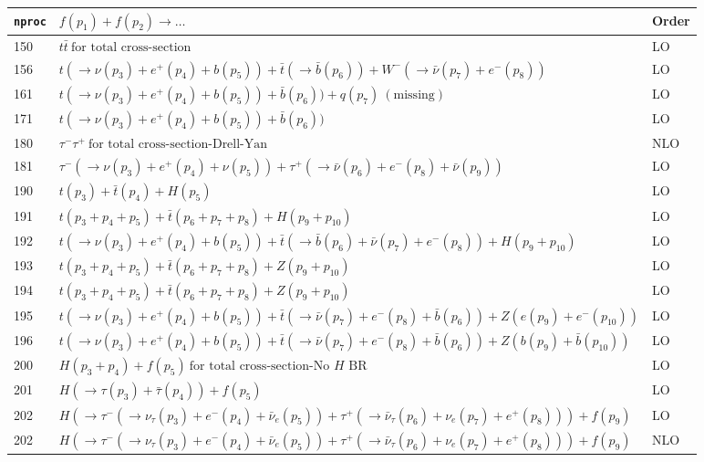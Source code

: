 \documentclass[12pt]{article}
\begin{document}
\begin{itemize}
\begin{table}
\begin{center}
\hspace*{-1.5cm}
\begin{tabular}{|l|l|l|}
\hline
{\tt nproc} & $f(p_1)+f(p_2) \to \ldots $& Order \\
\hline
150 & $ t \bar{t} ~\mbox{for total cross-section} $& LO \\ 
156 & $ t(\to\nu(p_3)+e^+(p_4)+b(p_5))+{\bar t}(\to
\bar{b}(p_6))+W^-(\to {\bar \nu}(p_7)+e^-(p_8))$& LO \\ 
\hline
161 & $ t(\to\nu(p_3)+e^+(p_4)+b(p_5))+\bar{b}(p_6))+q(p_7)~(\mathrm{missing}) $& LO \\ 
\hline
171 & $ t(\to \nu(p_3)+e^+(p_4)+b(p_5))+\bar{b}(p_6)) $& LO \\ 
\hline
180 & $ \tau^- \tau^+ ~\mbox{for total cross-section-Drell-Yan} $& NLO \\ 
181 & $ \tau^-(\to \nu(p_3)+e^+(p_4)+\nu(p_5))+\tau^+(\to \bar{\nu}(p_6)+e^-(p_8)+\bar{\nu}(p_9)) $& LO \\  
\hline
190 & $ t(p_3) + {\bar t}(p_4) + H(p_5) $& LO \\ 
191 & $ t(p_3+p_4+p_5) + {\bar t}(p_6+p_7+p_8) + H(p_9+p_{10}) $& LO \\ 
192 & $ t(\to \nu(p_3)+e^+(p_4)+b(p_5)) +
{\bar t}(\to {\bar b}(p_6)+{\bar \nu}(p_7)+e^-(p_8)) + H(p_9+p_{10}) $& LO \\ 
193 & $ t(p_3+p_4+p_5)+{\bar t}(p_6+p_7+p_8)+Z(p_9+p_{10})$& LO \\
194 & $ t(p_3+p_4+p_5)+{\bar t}(p_6+p_7+p_8)+Z(p_9+p_{10})$&LO \\
195 & $ t(\to \nu(p_3)+e^+(p_4)+b(p_5))+{\bar t}(\to {\bar \nu}(p_7)+e^-(p_8)+{\bar b}(p_6))+Z(e(p_9)+e^-(p_{10}))$&LO \\
196 & $ t(\to \nu(p_3)+e^+(p_4)+b(p_5))+{\bar t}(\to {\bar \nu}(p_7)+e^-(p_8)+{\bar b}(p_6))+Z(b(p_9)+{\bar b}(p_{10}))$&LO \\
\hline
200 & $ H(p_3+p_4) + f(p_5) ~\mbox{for total cross-section-No $H$ BR} $& LO \\ 
201 & $ H(\to \tau(p_3)+{\bar \tau}(p_4)) + f(p_5)$& LO \\ 
202 & $ H(\to \tau^- (\to \nu_\tau(p_3)+e^-(p_4)+{\bar \nu_e}(p_5))
+\tau^+(\to {\bar \nu_\tau}(p_6)+\nu_e(p_7)+e^+(p_8))) + f(p_9)$& LO \\ 
202 & $ H(\to \tau^- (\to \nu_\tau(p_3)+e^-(p_4)+{\bar \nu_e}(p_5))
+\tau^+(\to {\bar \nu_\tau}(p_6)+\nu_e(p_7)+e^+(p_8))) + f(p_9)$ & NLO\\ 

\end{tabular}
\end{center}
\end{table}
\end{itemize}
\end{document}
